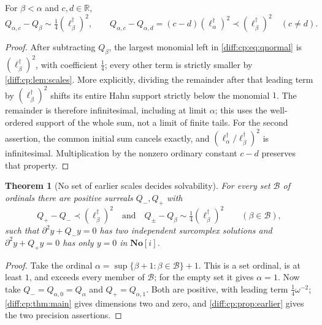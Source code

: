 \documentclass[11pt,letterpaper]{article}
\numberwithin{equation}{section}
\newtheorem{theorem}{Theorem}[section]
\theoremstyle{definition}
\theoremstyle{remark}
\newcommand{\SC}{\mathbf{No}[i]}
\newcommand{\R}{\mathbb R}
\newcommand{\der}{\partial}
\begin{document}
\begin{proposition}
\label{diff:cp:prop:earlier}
For $\beta<\alpha$ and $c,d\in\R$,
\begin{equation}\label{diff:cp:eq:earlier}
 Q_{\alpha,c}-Q_{\beta}\sim\tfrac14(\ell_{\beta}^{\dagger})^{2},
 \qquad
 Q_{\alpha,c}-Q_{\alpha,d}=(c-d)(\ell_{\alpha}^{\dagger})^{2}
 \prec(\ell_{\beta}^{\dagger})^{2}\quad(c\neq d).
\end{equation}
\end{proposition}
\begin{proof}
After subtracting $Q_{\beta}$, the largest monomial left in
\cref{diff:cp:eq:qnormal} is $(\ell_{\beta}^{\dagger})^{2}$, with coefficient
$\frac14$; every other term is strictly smaller by \cref{diff:cp:lem:scales}.
More explicitly, dividing the remainder after that leading term
by $(\ell_{\beta}^{\dagger})^{2}$ shifts its entire Hahn support
strictly below the monomial $1$. The remainder is therefore
infinitesimal, including at limit $\alpha$; this uses the
well-ordered support of the whole sum, not a limit of finite tails.
For the second assertion, the common initial sum cancels exactly,
and $(\ell_{\alpha}^{\dagger}/\ell_{\beta}^{\dagger})^{2}$ is
infinitesimal. Multiplication by the nonzero ordinary constant
$c-d$ preserves that property.
\end{proof}

\begin{theorem}[No set of earlier scales decides solvability]
\label{diff:cp:thm:invisible}
For every set $\mathcal B$ of ordinals there are positive surreals $Q_{-},Q_{+}$
with
\[
 Q_{+}-Q_{-}\prec(\ell_{\beta}^{\dagger})^{2}
 \quad\text{and}\quad
 Q_{\pm}-Q_{\beta}\sim\tfrac14(\ell_{\beta}^{\dagger})^{2}
 \qquad(\beta\in\mathcal B),
\]
such that $\der^{2}y+Q_{-}y=0$ has two independent surcomplex solutions and
$\der^{2}y+Q_{+}y=0$ has only $y=0$ in $\SC$.
\end{theorem}
\begin{proof}
Take the ordinal
$\alpha=\sup\{\beta+1:\beta\in\mathcal B\}+1$.
This is a set ordinal, is at least $1$, and exceeds every member
of $\mathcal B$; for the empty set it gives $\alpha=1$.
Now take $Q_{-}=Q_{\alpha,0}=Q_{\alpha}$
and $Q_{+}=Q_{\alpha,1}$. Both are positive, with leading term
$\frac14\omega^{-2}$; \cref{diff:cp:thm:main} gives dimensions two and zero, and
\cref{diff:cp:prop:earlier} gives the two precision assertions.
\end{proof}
\end{document}
